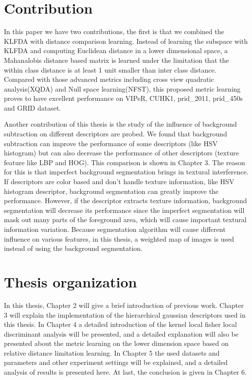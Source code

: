 \section{Contribution}

In this paper we have two contributions, the first is that we combined the KLFDA with distance comparison learning. Instead of learning the subspace with KLFDA and computing Euclidean distance in a lower dimensional space, a Mahanalobis distance based matrix is learned under the limitation that the within class distance is at least 1 unit smaller than inter class distance. Compared with those advanced metrics including cross view quadratic analysis(XQDA) \cite{LOMO} and Null space learning(NFST), this proposed metric learning proves to have excellent performance on VIPeR, CUHK1, prid\_2011, prid\_450s and GRID dataset.

Another contribution of this thesis is the study of the influence of background subtraction on different descriptors are probed. We found that background subtraction can improve the performance of some descriptors (like HSV histogram) but can also decrease the performance of  other descriptors (texture feature like LBP and HOG). This comparison is shown in Chapter 3. The reason for this is that imperfect background segmentation brings in textural interference. If descriptors are color based and don't handle texture information, like HSV histogram descriptor, background segmentation can greatly improve the performance. However, if the descriptor extracts texture information, background segmentation will decrease its performance since the imperfect segmentation will mask out many parts of the foreground area, which will cause important textural information variation. Because segmentation algorithm will cause different influence on various features, in this thesis, a weighted map of images is used instead of using the background segmentation.

\section{Thesis organization}
In this thesis, Chapter 2 will give a brief introduction of previous work. Chapter 3 will explain the implementation of the hierarchical gaussian descriptors used in this thesis. In Chapter 4 a detailed introduction of the kernel local fisher local discriminant analysis will be presented, and a detailed explanation will also be presented about the metric learning on the lower dimension space based on relative distance limitation learning.
In Chapter 5 the used datasets and parameters and other experiment settings will be explained, and a detailed analysis of results is presented here. At last, the conclusion is given in Chapter 6.




